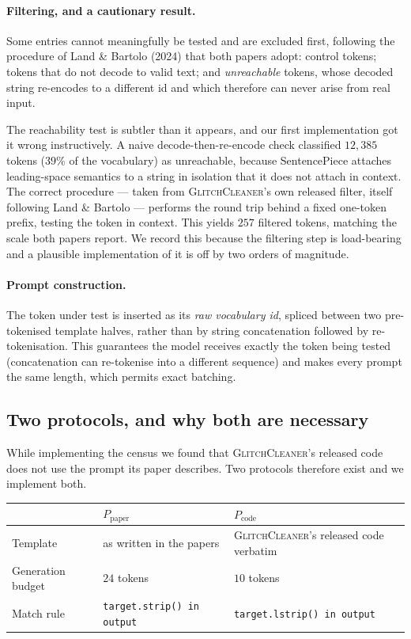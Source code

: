 \documentclass[11pt,a4paper]{article}
\newcommand{\gc}{\textsc{GlitchCleaner}}
\newcommand{\Ppaper}{$P_{\mathrm{paper}}$}
\newcommand{\Pcode}{$P_{\mathrm{code}}$}
\begin{document}
\paragraph{Filtering, and a cautionary result.}
Some entries cannot meaningfully be tested and are excluded first, following the
procedure of Land \& Bartolo (2024) that both papers adopt: control tokens; tokens
that do not decode to valid text; and \emph{unreachable} tokens, whose decoded
string re-encodes to a different id and which therefore can never arise from real
input.

The reachability test is subtler than it appears, and our first implementation got
it wrong instructively. A naive decode-then-re-encode check classified $12{,}385$
tokens ($39\%$ of the vocabulary) as unreachable, because SentencePiece attaches
leading-space semantics to a string in isolation that it does not attach in
context. The correct procedure --- taken from \gc{}'s own released filter, itself
following Land \& Bartolo --- performs the round trip behind a fixed one-token
prefix, testing the token in context. This yields $257$ filtered tokens, matching
the scale both papers report. We record this because the filtering step is
load-bearing and a plausible implementation of it is off by two orders of
magnitude.

\paragraph{Prompt construction.}
The token under test is inserted as its \emph{raw vocabulary id}, spliced between
two pre-tokenised template halves, rather than by string concatenation followed by
re-tokenisation. This guarantees the model receives exactly the token being tested
(concatenation can re-tokenise into a different sequence) and makes every prompt
the same length, which permits exact batching.

\subsection{Two protocols, and why both are necessary}
\label{sec:two-protocols}

While implementing the census we found that \gc{}'s released code does not use the
prompt its paper describes. Two protocols therefore exist and we implement both.

\begin{center}
\begin{tabular}{lll}
\toprule
& \Ppaper{} & \Pcode{} \\
\midrule
Template & as written in the papers & \gc{}'s released code verbatim \\
Generation budget & $24$ tokens & $10$ tokens \\
Match rule & \texttt{target.strip() in output} & \texttt{target.lstrip() in output} \\
\bottomrule
\end{tabular}
\end{center}
\end{document}
